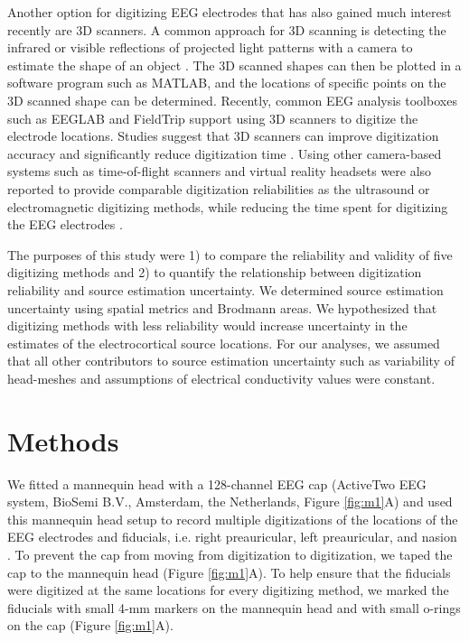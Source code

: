 \documentclass{UCF_ETD}
\newcommand{\ignore}[1]{}
\renewcommand{\ul}{}
\begin{document}
Another option for digitizing EEG electrodes that has also gained much interest recently are 3D scanners. A common approach for 3D scanning is detecting the infrared or visible reflections of projected light patterns with a camera to estimate the shape of an object \citep{Chen1987-py}. The 3D scanned shapes can then be plotted in a software program such as MATLAB, and the locations of specific points on the 3D scanned shape can be determined. Recently, common EEG analysis toolboxes such as EEGLAB \citep{Delorme2004-yy} and FieldTrip \citep{Oostenveld2010-ss} support using 3D scanners to digitize the electrode locations. Studies suggest that 3D scanners can improve digitization accuracy and significantly reduce digitization time \citep{Taberna2019-zv}. Using other camera-based systems such as time-of-flight scanners and virtual reality headsets were also reported to provide comparable digitization reliabilities as the ultrasound or electromagnetic digitizing methods, while reducing the time spent for digitizing the EEG electrodes \citep{Cline2018-qo,Vema_Krishna_Murthy2014-qk,Zhang2014-jh}.

The purposes of this study were 1) to compare the reliability and validity of five digitizing methods and 2) to quantify the relationship between digitization reliability and source estimation uncertainty.\ignore{ We only accounted for the digitization variability of having multiple operators digitize EEG electrode locations with different digitizing methods, and tried to minimize other sources of variability.} We determined source estimation uncertainty using spatial metrics and Brodmann areas.
We hypothesized that digitizing methods with less reliability would increase uncertainty in the estimates of the electrocortical source locations. For our analyses, we assumed that all other contributors to source estimation uncertainty such as variability of head-meshes and assumptions of electrical conductivity values were constant.

\section{Methods}
We fitted a mannequin head with a 128-channel EEG cap (ActiveTwo EEG system, BioSemi B.V., Amsterdam, the Netherlands, Figure \ref{fig:m1}A) and used this mannequin head setup to record multiple digitizations of the locations of the EEG electrodes and fiducials, i.e. right preauricular, left preauricular, and nasion \ul{\citep{Klem1999-ai}}. To prevent the cap from moving from digitization to digitization, we taped the cap to the mannequin head  (Figure \ref{fig:m1}A). To help ensure that the fiducials were digitized at the same locations for every digitizing method, we marked the fiducials with small 4-mm markers on the mannequin head and with small o-rings on the cap (Figure \ref{fig:m1}A). 
\end{document}
